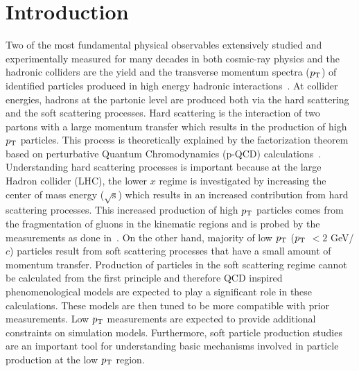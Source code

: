 \documentclass{article}
\newcommand{\sqrts}{\mbox{$\sqrt{\mathrm{s}}$}}
\newcommand{\ppt}{$p_{\rm T}$}
\begin{document}

\section{Introduction}\label{sec1}
Two of the most fundamental physical observables extensively studied and experimentally measured for many decades in both cosmic-ray physics and the hadronic colliders are the yield and the transverse momentum spectra ({\ppt}) of identified particles produced in high energy hadronic interactions~\cite{1}. At collider energies, hadrons at the partonic level are produced both via the hard scattering and the soft scattering processes. Hard scattering is the interaction of two partons with a large momentum transfer  which results in the production of high {\ppt} particles. This process is theoretically explained by the factorization theorem based on perturbative Quantum Chromodynamics (p-QCD) calculations~\cite{2}. Understanding hard scattering processes is important because at the large Hadron collider (LHC), the lower $x$ regime is investigated by increasing the center of mass energy (\sqrts) which results in an increased contribution from hard scattering processes. This increased production of high {\ppt} particles comes from the fragmentation of gluons in the kinematic regions and is probed by the measurements as done in~\cite{2,3}. On the other hand, majority of low {\ppt} ({\ppt} $< 2$ GeV/$c$) particles result from soft scattering processes that have a small amount of momentum transfer. Production of particles in the soft scattering regime cannot be calculated from the first principle and therefore QCD inspired phenomenological models are expected to play a significant role in these calculations. These models are then tuned to be more compatible with prior measurements. Low {\ppt} measurements are  expected to provide additional constraints on simulation models. Furthermore, soft particle production studies are an important tool for understanding basic mechanisms involved in particle production at the low {\ppt} region.
\end{document}
